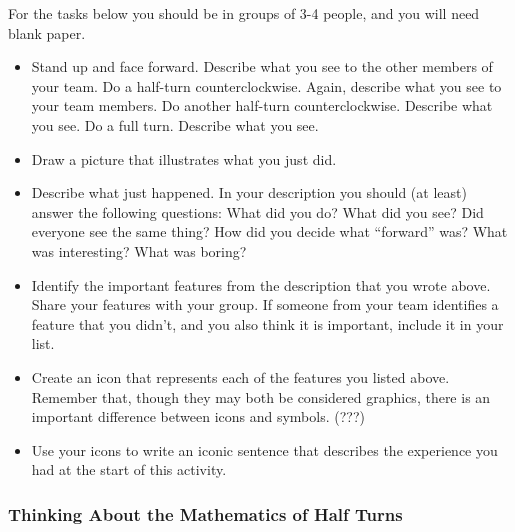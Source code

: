 \documentclass[11pt]{article}
\newenvironment{task}
	{\begin{mdframed}[linecolor=lightgray, linewidth=3pt]\raggedright}
	{\end{mdframed}}
\theoremstyle{definition}
\begin{document}
For the tasks below you should be in groups of 3-4 people, and you will need blank paper.

\begin{task}
\begin{itemize}
  \item Stand up and face forward. Describe what you see to the other members of your team. Do a half-turn counterclockwise. Again, describe what you see to your team members. 
    Do another half-turn counterclockwise. Describe what you see. Do a full turn. Describe what you see. 
  \item Draw a picture that illustrates what you just did.
  \item Describe what just happened. In your description you should (at least) answer the following questions: What did you do? What did you see? Did everyone see the same thing? How did you decide what ``forward'' was? 
    What was interesting? What was boring?
  \item Identify the important features from the description that you wrote above. Share your features with your group. If someone from your team identifies a feature that you didn’t, and you also 
    think it is important, include it in your list.
  \item Create an icon that represents each of the features you listed above. Remember that, though they may both be considered graphics, there is an important difference between icons and symbols. (???)
  \item Use your icons to write an iconic sentence that describes the experience you had at the start of this activity.
\end{itemize}
\end{task}

\subsubsection{Thinking About the Mathematics of Half Turns}
\end{document}
